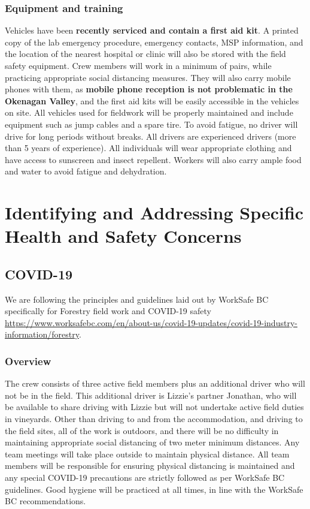 \documentclass[11pt,letter]{article}
\begin{document}
\subsubsection{Equipment and training}
Vehicles have been \textbf{recently serviced and contain a first aid kit}. A printed copy of the lab emergency procedure, emergency contacts, MSP information, and the location of the nearest hospital or clinic will also be stored with the field safety equipment. Crew members will work in a minimum of pairs, while practicing appropriate social distancing measures. They will also carry mobile phones with them, as \textbf{mobile phone reception is not problematic in the Okenagan Valley}, and the first aid kits will be easily accessible in the vehicles on site. All vehicles used for fieldwork will be properly maintained and include equipment such as jump cables and a spare tire. To avoid fatigue, no driver will drive for long periods without breaks. All drivers are experienced drivers (more than 5 years of experience). All individuals will wear appropriate clothing and have access to sunscreen and insect repellent. Workers will also carry ample food and water to avoid fatigue and dehydration.  


\section{Identifying and Addressing Specific Health and Safety Concerns}

\subsection{COVID-19}

We are following the principles and guidelines laid out by WorkSafe BC specifically for Forestry field work and COVID-19 safety \url{https://www.worksafebc.com/en/about-us/covid-19-updates/covid-19-industry-information/forestry}. 

\subsubsection{Overview}
The crew consists of three active field members plus an additional driver who will not be in the field. This additional driver is Lizzie's partner Jonathan, who will be available to share driving with Lizzie but will not undertake active field duties in vineyards. Other than driving to and from the accommodation, and driving to the field sites, all of the work is outdoors, and there will be no difficulty in maintaining appropriate social distancing of two meter minimum distances. Any team meetings will take place outside to maintain physical distance. All team members will be responsible for ensuring physical distancing is maintained and any special COVID-19 precautions are strictly followed as per WorkSafe BC guidelines. Good hygiene will be practiced at all times, in line with the  WorkSafe BC recommendations. 
\end{document}
